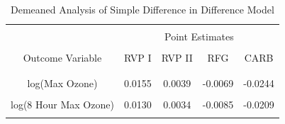 \documentclass{article}
\begin{document}
\begin{table}[h]
\centering
\begin{tabular}{ccccc}\hline \\
\multicolumn{1}{l}{}  & \multicolumn{4}{c}{Point Estimates} \\ \cline{2-5} \\
Outcome Variable      & RVP I  & RVP II & RFG     & CARB    \\ \\ \hline \\ 
log(Max Ozone)        & 0.0155 & 0.0039 & -0.0069 & -0.0244 \\\\ 
log(8 Hour Max Ozone) & 0.0130 & 0.0034 & -0.0085 & -0.0209 \\ \\ \hline
\end{tabular}
\caption{Demeaned Analysis of Simple Difference in Difference Model}
\label{tab:robust_table1}
\end{table}
\end{document}

